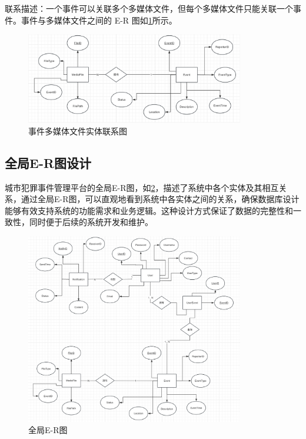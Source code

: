 联系描述：一个事件可以关联多个多媒体文件，但每个多媒体文件只能关联一个事件。事件与多媒体文件之间的 E-R 图如\cref{fig:rela-event-mediafile}所示。

\begin{figure}[h!]
    \centering
    \includegraphics[width=0.85\textwidth]{figures/db-img-rela-03.png}
    \caption{事件多媒体文件实体联系图}
    \label{fig:rela-event-mediafile}
\end{figure}



\subsection{全局E-R图设计}

城市犯罪事件管理平台的全局E-R图，如\cref{fig:rela-tot}，描述了系统中各个实体及其相互关系，通过全局E-R图，可以直观地看到系统中各实体之间的关系，确保数据库设计能够有效支持系统的功能需求和业务逻辑。这种设计方式保证了数据的完整性和一致性，同时便于后续的系统开发和维护。

\begin{figure}[h!]
    \centering
    \includegraphics[width=0.85\textwidth]{figures/db-img-rela-tot.png}
    \caption{全局E-R图}
    \label{fig:rela-tot}
\end{figure}
